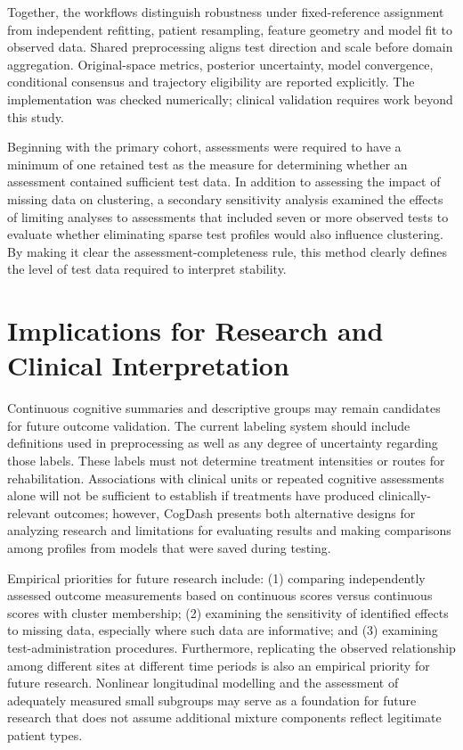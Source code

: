 Together, the workflows distinguish robustness under fixed-reference assignment from independent refitting, patient resampling, feature geometry and model fit to observed data. Shared preprocessing aligns test direction and scale before domain aggregation. Original-space metrics, posterior uncertainty, model convergence, conditional consensus and trajectory eligibility are reported explicitly. The implementation was checked numerically; clinical validation requires work beyond this study.

Beginning with the primary cohort, assessments were required to have a minimum of one retained test as the measure for determining whether an assessment contained sufficient test data. In addition to assessing the impact of missing data on clustering, a secondary sensitivity analysis examined the effects of limiting analyses to assessments that included seven or more observed tests to evaluate whether eliminating sparse test profiles would also influence clustering. By making it clear the assessment-completeness rule, this method clearly defines the level of test data required to interpret stability.

\section{Implications for Research and Clinical Interpretation}

Continuous cognitive summaries and descriptive groups may remain candidates for future outcome validation. The current labeling system should include definitions used in preprocessing as well as any degree of uncertainty regarding those labels. These labels must not determine treatment intensities or routes for rehabilitation. Associations with clinical units or repeated cognitive assessments alone will not be sufficient to establish if treatments have produced clinically-relevant outcomes; however, CogDash presents both alternative designs for analyzing research and limitations for evaluating results and making comparisons among profiles from models that were saved during testing.

Empirical priorities for future research include: (1) comparing independently assessed outcome measurements based on continuous scores versus continuous scores with cluster membership; (2) examining the sensitivity of identified effects to missing data, especially where such data are informative; and (3) examining test-administration procedures. Furthermore, replicating the observed relationship among different sites at different time periods is also an empirical priority for future research. Nonlinear longitudinal modelling and the assessment of adequately measured small subgroups may serve as a foundation for future research that does not assume additional mixture components reflect legitimate patient types.

